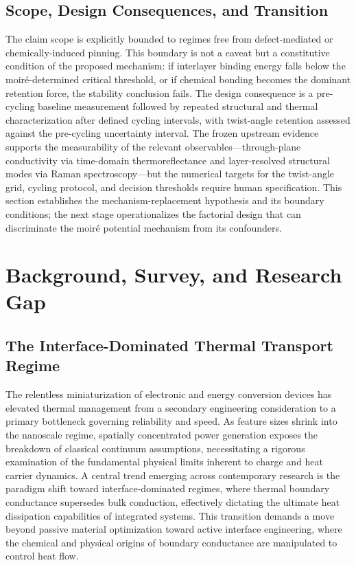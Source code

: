 \documentclass[conference]{IEEEtran}
\begin{document}
\subsection{Scope, Design Consequences, and Transition}
The claim scope is explicitly bounded to regimes free from defect-mediated or chemically-induced pinning. This boundary is not a caveat but a constitutive condition of the proposed mechanism: if interlayer binding energy falls below the moiré-determined critical threshold, or if chemical bonding becomes the dominant retention force, the stability conclusion fails. The design consequence is a pre-cycling baseline measurement followed by repeated structural and thermal characterization after defined cycling intervals, with twist-angle retention assessed against the pre-cycling uncertainty interval. The frozen upstream evidence supports the measurability of the relevant observables---through-plane conductivity via time-domain thermoreflectance and layer-resolved structural modes via Raman spectroscopy---but the numerical targets for the twist-angle grid, cycling protocol, and decision thresholds require human specification. This section establishes the mechanism-replacement hypothesis and its boundary conditions; the next stage operationalizes the factorial design that can discriminate the moiré potential mechanism from its confounders.~\cite{cite_26ecaf73d88dfe33,cite_c8ce7e25ee0b4157}

\section{Background, Survey, and Research Gap}
\subsection{The Interface-Dominated Thermal Transport Regime}
The relentless miniaturization of electronic and energy conversion devices has elevated thermal management from a secondary engineering consideration to a primary bottleneck governing reliability and speed. As feature sizes shrink into the nanoscale regime, spatially concentrated power generation exposes the breakdown of classical continuum assumptions, necessitating a rigorous examination of the fundamental physical limits inherent to charge and heat carrier dynamics. A central trend emerging across contemporary research is the paradigm shift toward interface-dominated regimes, where thermal boundary conductance supersedes bulk conduction, effectively dictating the ultimate heat dissipation capabilities of integrated systems. This transition demands a move beyond passive material optimization toward active interface engineering, where the chemical and physical origins of boundary conductance are manipulated to control heat flow.~\cite{cite_c8ce7e25ee0b4157}
\end{document}

